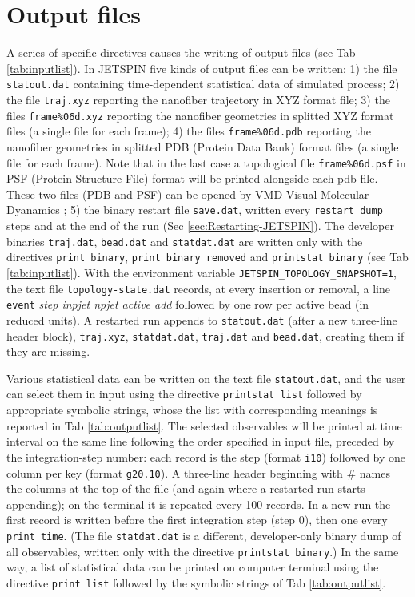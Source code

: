 \section{Output files\label{sec:Output-files}}

A series of specific directives causes the writing of output files
(see Tab \ref{tab:inputlist}). In JETSPIN five kinds of output files can
be written: 1) the file \texttt{statout.dat} containing time-dependent
statistical data of simulated process; 2) the file \texttt{traj.xyz}
reporting the nanofiber trajectory in XYZ format file; 3) the files
\texttt{frame\%06d.xyz} reporting the nanofiber geometries in splitted
XYZ format files (a single file for each frame); 4) the files \texttt{frame\%06d.pdb}
reporting the nanofiber geometries in splitted PDB (Protein Data Bank)
format files (a single file for each frame). Note that in the last
case a topological file \texttt{frame\%06d.psf} in PSF (Protein Structure
File) format will be printed alongside each pdb file. These two files
(PDB and PSF) can be opened by VMD-Visual Molecular Dyanamics \cite{humphrey1996vmd};
5) the binary restart file \texttt{save.dat}, written every
\texttt{restart dump} steps and at the end of the run (Sec
\ref{sec:Restarting-JETSPIN}). The developer binaries \texttt{traj.dat},
\texttt{bead.dat} and \texttt{statdat.dat} are written only with the
directives \texttt{print binary}, \texttt{print binary removed} and
\texttt{printstat binary} (see Tab \ref{tab:inputlist}). With the
environment variable \texttt{JETSPIN\_TOPOLOGY\_SNAPSHOT=1}, the text
file \texttt{topology-state.dat} records, at every insertion or removal,
a line \texttt{event} \textit{step inpjet npjet active add} followed by
one row per active bead (in reduced units). A restarted run appends
to \texttt{statout.dat} (after a new three-line header block),
\texttt{traj.xyz}, \texttt{statdat.dat}, \texttt{traj.dat} and
\texttt{bead.dat}, creating them if they are missing.

Various statistical data can be written on the text file \texttt{statout.dat},
and the user can select them in input using the directive \texttt{printstat
list} followed by appropriate symbolic strings, whose the list with
corresponding meanings is reported in Tab \ref{tab:outputlist}. The
selected observables will be printed at time interval on the same
line following the order specified in input file, preceded by the
integration-step number: each record is the step (format \texttt{i10})
followed by one column per key (format \texttt{g20.10}). A three-line
header beginning with \# names the columns at the top of the file (and
again where a restarted run starts appending); on the terminal it is
repeated every 100 records. In a new run the first record is written
before the first integration step (step 0), then one every
\texttt{print time}. (The file
\texttt{statdat.dat} is a different,
developer-only binary dump of all observables, written only with the
directive \texttt{printstat binary}.) In the same way,
a list of statistical data can be printed on computer terminal using
the directive \texttt{print list} followed by the symbolic strings
of Tab \ref{tab:outputlist}.

